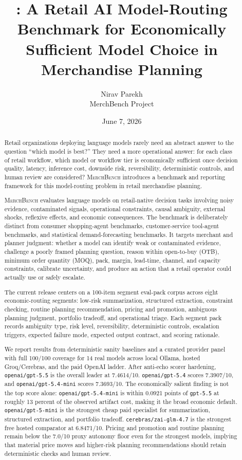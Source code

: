 \documentclass[11pt]{article}
\title{\benchmark{}: A Retail AI Model-Routing Benchmark for Economically Sufficient Model Choice in Merchandise Planning}
\author{Nirav Parekh \\ MerchBench Project}
\date{June 7, 2026}
\newcommand{\benchmark}{\textsc{MerchBench}}
\newcommand{\score}[1]{#1/10}
\newcommand{\code}[1]{\texttt{#1}}
\begin{document}
\maketitle

\begin{abstract}
Retail organizations deploying language models rarely need an abstract answer to the question ``which model is best?'' They need a more operational answer: for each class of retail workflow, which model or workflow tier is economically sufficient once decision quality, latency, inference cost, downside risk, reversibility, deterministic controls, and human review are considered? \benchmark{} introduces a benchmark and reporting framework for this model-routing problem in retail merchandise planning.

\benchmark{} evaluates language models on retail-native decision tasks involving noisy evidence, contaminated signals, operational constraints, causal ambiguity, external shocks, reflexive effects, and economic consequences. The benchmark is deliberately distinct from consumer shopping-agent benchmarks, customer-service tool-agent benchmarks, and statistical demand-forecasting benchmarks. It targets merchant and planner judgment: whether a model can identify weak or contaminated evidence, challenge a poorly framed planning question, reason within open-to-buy (OTB), minimum order quantity (MOQ), pack, margin, lead-time, channel, and capacity constraints, calibrate uncertainty, and produce an action that a retail operator could actually use or safely escalate.

The current release centers on a 100-item segment eval-pack corpus across eight economic-routing segments: low-risk summarization, structured extraction, constraint checking, routine planning recommendation, pricing and promotion, ambiguous planning judgment, portfolio tradeoff, and operational triage. Each segment pack records ambiguity type, risk level, reversibility, deterministic controls, escalation triggers, expected failure mode, expected output contract, and scoring rationale.

We report results from deterministic sanity baselines and a curated provider panel with full 100/100 coverage for 14 real models across local Ollama, hosted Groq/Cerebras, and the paid OpenAI ladder. After anti-echo scorer hardening, \code{openai/gpt-5.5} is the overall leader at \score{7.4614}. \code{openai/gpt-5.4} scores \score{7.3907}, and \code{openai/gpt-5.4-mini} scores \score{7.3693}. The economically salient finding is not the top score alone: \code{openai/gpt-5.4-mini} is within 0.0921 points of \code{gpt-5.5} at roughly 13 percent of the observed artifact cost, making it the broad economic default. \code{openai/gpt-5-mini} is the strongest cheap paid specialist for summarization, structured extraction, and portfolio tradeoff. \code{cerebras/zai-glm-4.7} is the strongest free hosted comparator at \score{6.8471}. Pricing and promotion and routine planning remain below the \score{7.0} proxy autonomy floor even for the strongest models, implying that material price moves and higher-risk planning recommendations should retain deterministic checks and human review.


\end{abstract}
\end{document}

